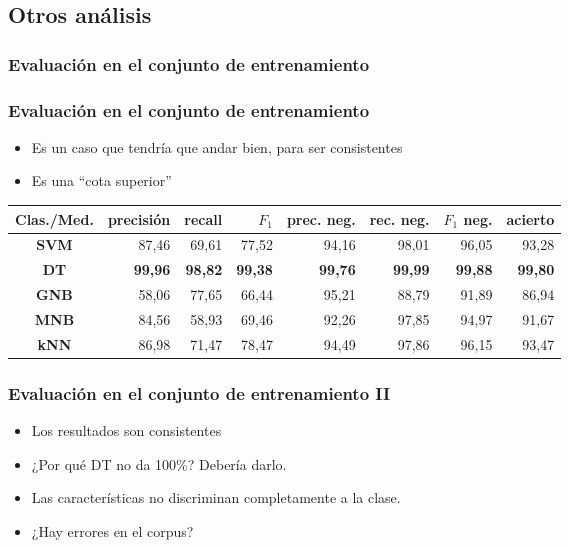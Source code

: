 \subsection{Otros análisis}

\subsubsection{Evaluación en el conjunto de entrenamiento}
\begin{frame}
    \frametitle{Evaluación en el conjunto de entrenamiento}

    \begin{itemize}
        \item Es un caso que tendría que andar bien, para ser consistentes
        \item Es una ``cota superior''
    \end{itemize}

    \begin{center}
        \scriptsize
        \begin{tabular}{ c | r | r | r | r | r | r | r }
            \textbf{Clas./Med.} & precisión & recall & $F_1$ & prec. neg. & rec. neg. & $F_1$ neg. & acierto \\
            \hline
            \textbf{SVM} & 87,46 & 69,61 & 77,52 & 94,16 & 98,01 & 96,05 & 93,28\\
            \hline
            \textbf{DT} & \textbf{99,96} & \textbf{98,82} & \textbf{99,38} & \textbf{99,76} & \textbf{99,99} & \textbf{99,88} & \textbf{99,80} \\
            \hline
            \textbf{GNB} & 58,06 & 77,65 & 66,44 & 95,21 & 88,79 & 91,89 & 86,94 \\
            \hline
            \textbf{MNB} & 84,56 & 58,93 & 69,46 & 92,26 & 97,85 & 94,97 & 91,67 \\
            \hline
            \textbf{kNN} & 86,98 & 71,47 & 78,47 & 94,49 & 97,86 & 96,15 & 93,47 \\
        \end{tabular}
    \end{center}
\end{frame}

\begin{frame}
    \frametitle{Evaluación en el conjunto de entrenamiento II}

    \begin{itemize}[<+->]
        \item Los resultados son consistentes
        \item ¿Por qué DT no da 100\%? Debería darlo.
        \item Las características no discriminan completamente a la clase.
        \item ¿Hay errores en el corpus?
    \end{itemize}
\end{frame}

